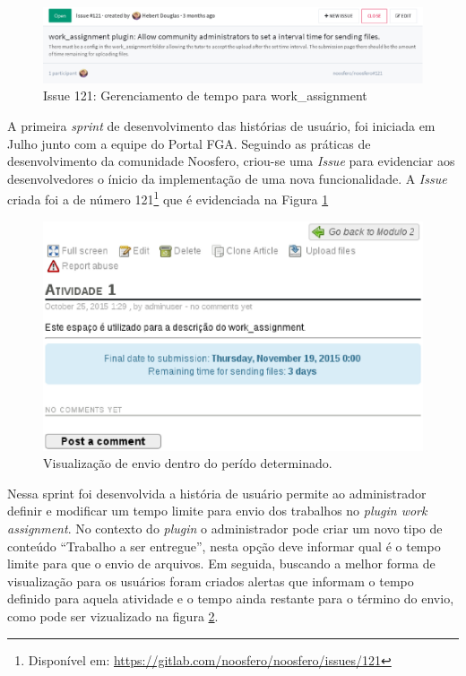 \begin{figure}[h]
    \centering
    \includegraphics[keepaspectratio=true,scale=0.4]
      {figuras/issue121.eps}
    \caption{Issue 121: Gerenciamento de tempo para work\_assignment}
    \label{fig:issue-121}
\end{figure}

A primeira \textit{sprint} de desenvolvimento das histórias de usuário, foi iniciada em Julho junto com a equipe do Portal FGA. Seguindo as práticas de desenvolvimento da comunidade Noosfero, criou-se uma \textit{Issue} para evidenciar aos desenvolvedores o ínicio da implementação de uma nova funcionalidade. A \textit{Issue} criada foi a de número 121\footnote{Disponível em: \url{https://gitlab.com/noosfero/noosfero/issues/121}} que  é evidenciada na Figura \ref{fig:issue-121}

\begin{figure}[h]
    \centering
    \includegraphics[keepaspectratio=true,scale=0.7]
      {figuras/work-open.eps}
    \caption{Visualização de envio dentro do perído determinado.}
    \label{fig:work-open}
\end{figure}

Nessa sprint foi desenvolvida a história de usuário permite ao administrador definir e modificar um tempo limite para envio dos trabalhos no \textit{plugin work assignment}. No contexto do \textit{plugin} o administrador pode criar um novo tipo de conteúdo ``Trabalho a ser entregue'', nesta opção deve informar qual é o tempo limite para que o envio de arquivos. Em seguida, buscando a melhor forma de visualização para os usuários foram criados alertas que informam o tempo definido para aquela atividade e o tempo ainda restante para o término do envio, como pode ser vizualizado na figura \ref{fig:work-open}.

